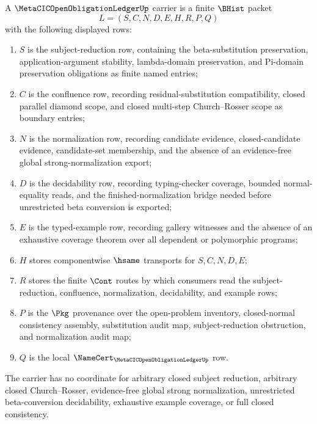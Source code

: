 \begin{definition}
\label{def:metacic-open-obligation-ledger-carrier}
A $\MetaCICOpenObligationLedgerUp$ carrier is a finite $\BHist$ packet
$$
L=(S,C,N,D,E,H,R,P,Q)
$$
with the following displayed rows:
\begin{enumerate}
\item $S$ is the subject-reduction row, containing the beta-substitution preservation, application-argument stability, lambda-domain preservation, and Pi-domain preservation obligations as finite named entries;
\item $C$ is the confluence row, recording residual-substitution compatibility, closed parallel diamond scope, and closed multi-step Church--Rosser scope as boundary entries;
\item $N$ is the normalization row, recording candidate evidence, closed-candidate evidence, candidate-set membership, and the absence of an evidence-free global strong-normalization export;
\item $D$ is the decidability row, recording typing-checker coverage, bounded normal-equality reads, and the finished-normalization bridge needed before unrestricted beta conversion is exported;
\item $E$ is the typed-example row, recording gallery witnesses and the absence of an exhaustive coverage theorem over all dependent or polymorphic programs;
\item $H$ stores componentwise $\hsame$ transports for $S,C,N,D,E$;
\item $R$ stores the finite $\Cont$ routes by which consumers read the subject-reduction, confluence, normalization, decidability, and example rows;
\item $P$ is the $\Pkg$ provenance over the open-problem inventory, closed-normal consistency assembly, substitution audit map, subject-reduction obstruction, and normalization audit map;
\item $Q$ is the local $\NameCert_{\MetaCICOpenObligationLedgerUp}$ row.
\end{enumerate}
The carrier has no coordinate for arbitrary closed subject reduction, arbitrary closed Church--Rosser, evidence-free global strong normalization, unrestricted beta-conversion decidability, exhaustive example coverage, or full closed consistency.
\end{definition}

